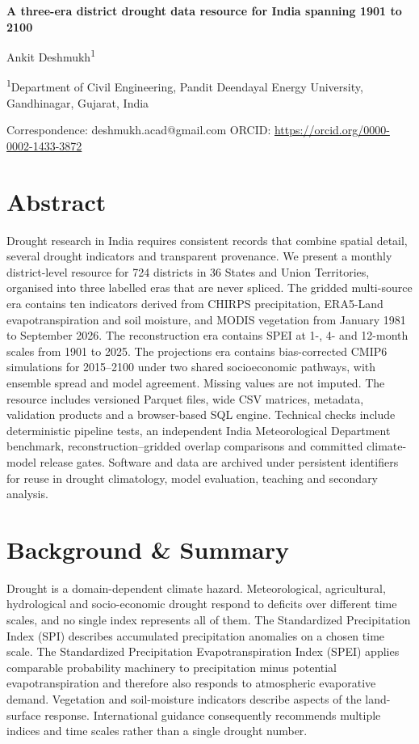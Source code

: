 \documentclass[11pt,a4paper]{article}
\begin{document}
{\LARGE\bfseries A three-era district drought data resource for India spanning 1901 to 2100\par}
\vspace{10pt}
{\large Ankit Deshmukh\textsuperscript{1}\par}
\vspace{4pt}
{\small\textsuperscript{1}Department of Civil Engineering, Pandit Deendayal Energy University, Gandhinagar, Gujarat, India\par}
\vspace{3pt}
{\small Correspondence: deshmukh.acad@gmail.com \quad ORCID: \url{https://orcid.org/0000-0002-1433-3872}\par}
\vspace{12pt}

\section*{Abstract}
Drought research in India requires consistent records that combine spatial detail, several drought indicators and transparent provenance. We present a monthly district-level resource for 724 districts in 36 States and Union Territories, organised into three labelled eras that are never spliced. The gridded multi-source era contains ten indicators derived from CHIRPS precipitation, ERA5-Land evapotranspiration and soil moisture, and MODIS vegetation from January 1981 to September 2026. The reconstruction era contains SPEI at 1-, 4- and 12-month scales from 1901 to 2025. The projections era contains bias-corrected CMIP6 simulations for 2015--2100 under two shared socioeconomic pathways, with ensemble spread and model agreement. Missing values are not imputed. The resource includes versioned Parquet files, wide CSV matrices, metadata, validation products and a browser-based SQL engine. Technical checks include deterministic pipeline tests, an independent India Meteorological Department benchmark, reconstruction--gridded overlap comparisons and committed climate-model release gates. Software and data are archived under persistent identifiers for reuse in drought climatology, model evaluation, teaching and secondary analysis.

\section*{Background \& Summary}
Drought is a domain-dependent climate hazard. Meteorological, agricultural, hydrological and socio-economic drought respond to deficits over different time scales, and no single index represents all of them\citep{WilhiteGlantz1985,MishraSingh2010}. The Standardized Precipitation Index (SPI) describes accumulated precipitation anomalies on a chosen time scale\citep{McKee1993}. The Standardized Precipitation Evapotranspiration Index (SPEI) applies comparable probability machinery to precipitation minus potential evapotranspiration and therefore also responds to atmospheric evaporative demand\citep{VicenteSerrano2010}. Vegetation and soil-moisture indicators describe aspects of the land-surface response\citep{Kogan1995}. International guidance consequently recommends multiple indices and time scales rather than a single drought number\citep{WMOLincoln2009}.
\end{document}
